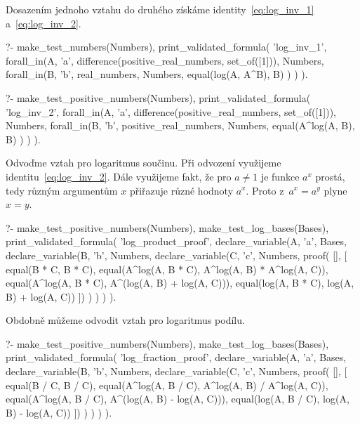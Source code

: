 Dosazením jednoho vztahu do druhého získáme identity~\eqref{eq:log_inv_1} a~\eqref{eq:log_inv_2}.

\begin{fact}
\begin{prolog}
?-	make_test_numbers(Numbers),
	print_validated_formula(
		'log_inv_1',
		forall_in(A, 'a', difference(positive_real_numbers, set_of([1])), Numbers,
			forall_in(B, 'b', real_numbers, Numbers,
				equal(log(A, A^B), B)
			)
		)
	).				
\end{prolog}
\begin{prolog}
?-	make_test_positive_numbers(Numbers),
	print_validated_formula(
		'log_inv_2',
		forall_in(A, 'a', difference(positive_real_numbers, set_of([1])), Numbers,
			forall_in(B, 'b', positive_real_numbers, Numbers,
				equal(A^log(A, B), B)
			)
		)
	).				
\end{prolog}
\end{fact}

Odvoďme vztah pro logaritmus součinu. Při odvození využijeme identitu~\eqref{eq:log_inv_2}. Dále využijeme fakt, že pro \(a \neq 1\) je funkce \(a^x\) prostá, tedy různým argumentům \(x\) přiřazuje různé hodnoty \(a^x\). Proto z~\(a^x = a^y\) plyne \(x = y\).

\begin{prolog}
?-	make_test_positive_numbers(Numbers),
	make_test_log_bases(Bases),
	print_validated_formula(
		'log_product_proof',
		declare_variable(A, 'a', Bases,
			declare_variable(B, 'b', Numbers,
				declare_variable(C, 'c', Numbers,
					proof(
					[],
					[
						equal(B * C, B * C),
						equal(A^log(A, B * C), A^log(A, B) * A^log(A, C)),
						equal(A^log(A, B * C), A^(log(A, B) + log(A, C))),
						equal(log(A, B * C), log(A, B) + log(A, C))
					])
				)
			)
		)
	).				
\end{prolog}

Obdobně můžeme odvodit vztah pro logaritmus podílu.

\begin{prolog}
?-	make_test_positive_numbers(Numbers),
	make_test_log_bases(Bases),
	print_validated_formula(
		'log_fraction_proof',
		declare_variable(A, 'a', Bases,
			declare_variable(B, 'b', Numbers,
				declare_variable(C, 'c', Numbers,
					proof(
					[],
					[
						equal(B / C, B / C),
						equal(A^log(A, B / C), A^log(A, B) / A^log(A, C)),
						equal(A^log(A, B / C), A^(log(A, B) - log(A, C))),
						equal(log(A, B / C), log(A, B) - log(A, C))
					])
				)
			)
		)
	).				
\end{prolog}

